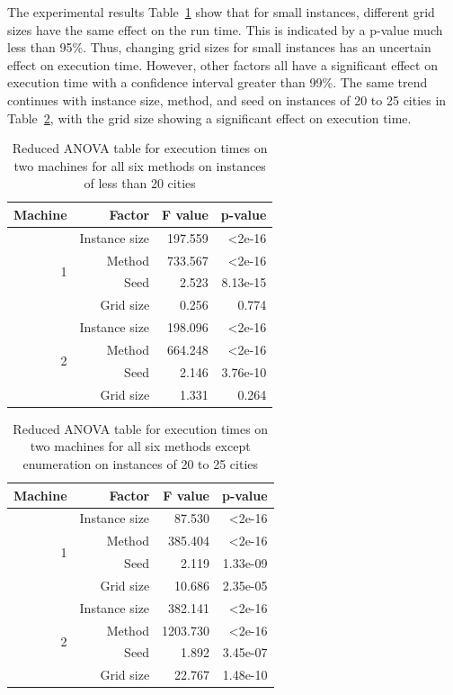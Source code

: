 \documentclass[11pt]{article}
\begin{document}
	The experimental results Table~\ref{tab:runtime_small_anova} show that for small instances, different grid sizes have the same effect on the run time. This is indicated by a p-value much less than 95\%. Thus, changing grid sizes for small instances has an uncertain effect on execution time. However, other factors all have a significant effect on execution time with a confidence interval greater than 99\%. The same trend continues with instance size, method, and seed on instances of 20 to 25 cities in Table~\ref{tab:runtime_medium_anova}, with the grid size showing a significant effect on execution time. 
\begin{table}
	\centering
	\begin{tabular}{r|r|rr}
		Machine & Factor & F value & p-value  \\
		\hline
		\hline
		\multirow{4}{*}{1} 
		& Instance size             & 197.559 & \textless 2e-16 \\
		& Method             & 733.567 & \textless 2e-16 \\
		\cline{2-4}
		& Seed            & 2.523 & 8.13e-15 \\
		& Grid size & 0.256 & 0.774 \\
		\hline
		\multirow{4}{*}{2}
		& Instance size             & 198.096 & \textless 2e-16 \\
		& Method             & 664.248 & \textless 2e-16 \\
		\cline{2-4}
		& Seed            & 2.146 & 3.76e-10 \\
		& Grid size & 1.331 & 0.264 \\
	\end{tabular}
	\caption{Reduced ANOVA table for execution times on two machines for all six methods on instances of less than 20 cities}
	\label{tab:runtime_small_anova}
\end{table}
	
\begin{table}
	\centering
	\begin{tabular}{r|r|rr}
		Machine & Factor & F value & p-value  \\
		\hline
		\hline
		\multirow{4}{*}{1} 
		& Instance size             & 87.530 & \textless 2e-16 \\
		& Method             & 385.404 & \textless 2e-16 \\
		\cline{2-4}
		& Seed            & 2.119 & 1.33e-09 \\
		& Grid size & 10.686 & 2.35e-05 \\
		\hline
		\multirow{4}{*}{2}
		& Instance size             & 382.141 & \textless 2e-16 \\
		& Method             & 1203.730 & \textless 2e-16 \\
		\cline{2-4}
		& Seed            &  1.892 & 3.45e-07\\
		& Grid size & 22.767 & 1.48e-10 \\
	\end{tabular}
	\caption{Reduced ANOVA table for execution times on two machines for all six methods except enumeration on instances of 20 to 25 cities}
	\label{tab:runtime_medium_anova}
\end{table}
	
\end{document}
